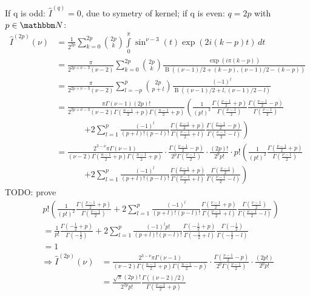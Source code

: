 If q is odd: $\hat I^{(q)}=0$, due to symetry of kernel; if q is even: $q=2p$ with $p\in\mathbbm N$:
\begin{align}
\hat I^{(2p)}(\nu) &= \frac 1 {2^{2p}}\sum\limits_{k=0}^{2p} \binom{2p}{k} \int\limits_0^\pi\sin^{\nu-3}(t)\exp(2i(k-p)t)\,dt\\
 &= \frac \pi{2^{2p+\nu-3} (\nu-2)}\sum\limits_{k=0}^{2p} \binom{2p}{k}\frac{\exp(i\pi(k-p))}{\mathop{B}((\nu-1)/2+(k-p),(\nu-1)/2-(k-p))}\\
 &= \frac \pi{2^{2p+\nu-3} (\nu-2)}\sum\limits_{l=-p}^{p} \binom{2p}{p+l}\frac{(-1)^l}{\mathop{B}((\nu-1)/2+l,(\nu-1)/2-l)}\\
 &= \frac {\pi\Gamma(\nu-1)(2p)!}{2^{2p+\nu-3} (\nu-2)\Gamma(\frac{n-1} 2+p)\Gamma(\frac{n-1} 2+p)}\left(\frac 1 {(p!)^2} \frac{\Gamma(\frac{\nu-1} 2+p)}{\Gamma(\frac{\nu-1} 2)}\frac{\Gamma(\frac{\nu-1} 2-p)}{\Gamma(\frac{\nu-1} 2)} \right. \nonumber\\
 &\hspace{40pt}\left. + 2\sum\limits_{l=1}^{p}\frac{(-1)^l}{(p+l)!(p-l)!}\frac{\Gamma(\frac{\nu-1} 2+p)}{\Gamma(\frac{\nu-1} 2+l)}\frac{\Gamma(\frac{\nu-1} 2-p)}{\Gamma(\frac{\nu-1} 2-l)}\right)\\
 &= \frac {2^{3-\nu}\pi\Gamma(\nu-1)}{(\nu-2)\Gamma(\frac{n-1} 2+p)\Gamma(\frac{n-1} 2+p)}\cdot \frac{\Gamma(\frac{\nu-1} 2-p)}{2^{p}\Gamma(\frac{\nu-1} 2)} \cdot \frac{(2p)!}{2^p p!} \cdot p! \left(\frac 1 {(p!)^2} \frac{\Gamma(\frac{\nu-1} 2+p)}{\Gamma(\frac{\nu-1} 2)} \right. \nonumber\\
 &\hspace{40pt}\left. + 2\sum\limits_{l=1}^{p}\frac{(-1)^l}{(p+l)!(p-l)!}\frac{\Gamma(\frac{\nu-1} 2+p)}{\Gamma(\frac{\nu-1} 2+l)}\frac{\Gamma(\frac{\nu-1} 2)}{\Gamma(\frac{\nu-1} 2-l)}\right)
\end{align}
TODO: prove 
\begin{align}
&p! \left(\frac 1 {(p!)^2} \frac{\Gamma(\frac{\nu-1} 2+p)}{\Gamma(\frac{\nu-1} 2)} + 2\sum\limits_{l=1}^{p}\frac{(-1)^l}{(p+l)!(p-l)!}\frac{\Gamma(\frac{\nu-1} 2+p)}{\Gamma(\frac{\nu-1} 2+l)}\frac{\Gamma(\frac{\nu-1} 2)}{\Gamma(\frac{\nu-1} 2-l)}\right)\\
&= \frac {1} {p!}\frac{\Gamma(-\frac{1}2+p)}{\Gamma(-\frac{1}2)} + 2\sum\limits_{l=1}^{p}\frac{(-1)^l p!}{(p+l)!(p-l)!}\frac{\Gamma(-\frac{1} 2+p)}{\Gamma(-\frac{1} 2+l)}\frac{\Gamma(-\frac{1} 2)}{\Gamma(-\frac{1} 2-l)}\\
&= 1
\end{align}
\begin{align}
\Rightarrow \hat I^{(2p)}(\nu) &=\frac {2^{3-\nu}\pi\Gamma(\nu-1)}{(\nu-2)\Gamma(\frac{n-1} 2+p)\Gamma(\frac{n-1} 2-p)} \cdot \frac{\Gamma(\frac{\nu-1} 2-p)}{2^{p}\Gamma(\frac{\nu-1} 2)} \cdot \frac{(2p!)}{2^p p!}\\
 &= \frac{\sqrt{\pi}(2p)!}{2^{2p}p!} \frac {\Gamma((\nu-2)/2)} {\Gamma(\frac{\nu-1}2+p)}
\end{align}


